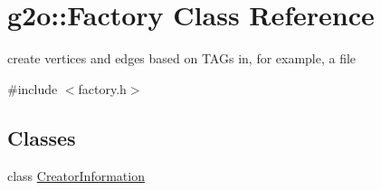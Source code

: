 \hypertarget{classg2o_1_1_factory}{}\section{g2o\+:\+:Factory Class Reference}
\label{classg2o_1_1_factory}


create vertices and edges based on T\+A\+Gs in, for example, a file  




{\ttfamily \#include $<$factory.\+h$>$}

\subsection*{Classes}
\begin{DoxyCompactItemize}
\item 
class \mbox{\hyperlink{classg2o_1_1_factory_1_1_creator_information}{Creator\+Information}}
\end{DoxyCompactItemize}
